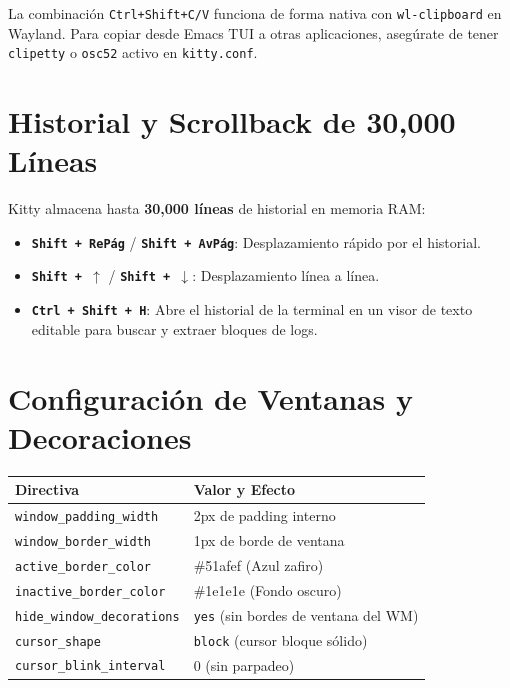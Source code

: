\documentclass[11pt,article,spanish]{apuntes-scr}
\begin{document}
\begin{notabox}
  La combinación \texttt{Ctrl+Shift+C/V} funciona de forma nativa con \texttt{wl-clipboard} en Wayland. Para copiar desde Emacs TUI a otras aplicaciones, asegúrate de tener \texttt{clipetty} o \texttt{osc52} activo en \texttt{kitty.conf}.
\end{notabox}

\section{Historial y Scrollback de 30,000 Líneas}
Kitty almacena hasta \textbf{30,000 líneas} de historial en memoria RAM:

\begin{itemize}[leftmargin=*]
    \item \textbf{\texttt{Shift + RePág}} / \textbf{\texttt{Shift + AvPág}}: Desplazamiento rápido por el historial.
    \item \textbf{\texttt{Shift + $\uparrow$}} / \textbf{\texttt{Shift + $\downarrow$}}: Desplazamiento línea a línea.
    \item \textbf{\texttt{Ctrl + Shift + H}}: Abre el historial de la terminal en un visor de texto editable para buscar y extraer bloques de logs.
\end{itemize}

\section{Configuración de Ventanas y Decoraciones}
\begin{center}
\small
\begin{tabularx}{\linewidth}{l X}
\toprule
\textbf{Directiva} & \textbf{Valor y Efecto} \\
\midrule
\texttt{window\_padding\_width} & 2px de padding interno \\
\texttt{window\_border\_width} & 1px de borde de ventana \\
\texttt{active\_border\_color} & \#51afef (Azul zafiro) \\
\texttt{inactive\_border\_color} & \#1e1e1e (Fondo oscuro) \\
\texttt{hide\_window\_decorations} & \texttt{yes} (sin bordes de ventana del WM) \\
\texttt{cursor\_shape} & \texttt{block} (cursor bloque sólido) \\
\texttt{cursor\_blink\_interval} & 0 (sin parpadeo) \\
\bottomrule
\end{tabularx}
\end{center}
\end{document}
